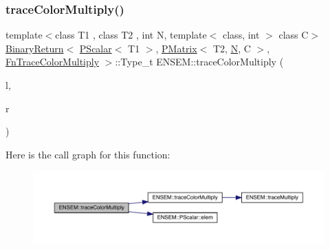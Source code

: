 \subsubsection{\texorpdfstring{traceColorMultiply()}{traceColorMultiply()}\hspace{0.1cm}{\footnotesize\ttfamily [3/3]}}
{\footnotesize\ttfamily template$<$class T1 , class T2 , int N, template$<$ class, int $>$ class C$>$ \\
\mbox{\hyperlink{structENSEM_1_1BinaryReturn}{Binary\+Return}}$<$ \mbox{\hyperlink{classENSEM_1_1PScalar}{P\+Scalar}}$<$ T1 $>$, \mbox{\hyperlink{classENSEM_1_1PMatrix}{P\+Matrix}}$<$ T2, \mbox{\hyperlink{operator__name__util_8cc_a7722c8ecbb62d99aee7ce68b1752f337}{N}}, C $>$, \mbox{\hyperlink{structENSEM_1_1FnTraceColorMultiply}{Fn\+Trace\+Color\+Multiply}} $>$\+::Type\+\_\+t E\+N\+S\+E\+M\+::trace\+Color\+Multiply (\begin{DoxyParamCaption}\item[{const \mbox{\hyperlink{classENSEM_1_1PScalar}{P\+Scalar}}$<$ T1 $>$ \&}]{l,  }\item[{const \mbox{\hyperlink{classENSEM_1_1PMatrix}{P\+Matrix}}$<$ T2, \mbox{\hyperlink{operator__name__util_8cc_a7722c8ecbb62d99aee7ce68b1752f337}{N}}, C $>$ \&}]{r }\end{DoxyParamCaption})\hspace{0.3cm}{\ttfamily [inline]}}

Here is the call graph for this function\+:\nopagebreak
\begin{figure}[H]
\begin{center}
\leavevmode
\includegraphics[width=350pt]{df/d0a/group__primmatrix_gad73631cec5794d9c294bbf815af14cc0_cgraph}
\end{center}
\end{figure}
\mbox{\label{group__primmatrix_ga91e09af0f8d2d70627950b973f6b41ec}} 
